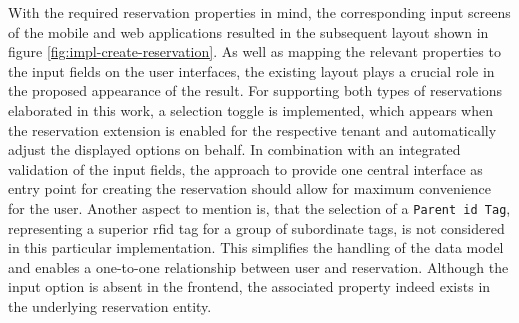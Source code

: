 \newpage

\noindent With the required reservation properties in mind, the corresponding input screens of the mobile and web applications resulted in the subsequent layout shown in figure \ref{fig:impl-create-reservation}. As well as mapping the relevant properties to the input fields on the user interfaces, the existing layout plays a crucial role in the proposed appearance of the result.
For supporting both types of reservations elaborated in this work, a selection toggle is implemented, which appears when the reservation extension is enabled for the respective tenant and automatically adjust the displayed options on behalf.
In combination with an integrated validation of the input fields, the approach to provide one central interface as entry point for creating the reservation should allow for maximum convenience for the user.
Another aspect to mention is, that the selection of a \texttt{Parent \acrshort{id} Tag}, representing a superior \acrshort{rfid} tag for a group of subordinate tags, is not considered in this particular implementation. This simplifies the handling of the data model and enables a one-to-one relationship between user and reservation.
Although the input option is absent in the frontend, the associated property indeed exists in the underlying reservation entity.

